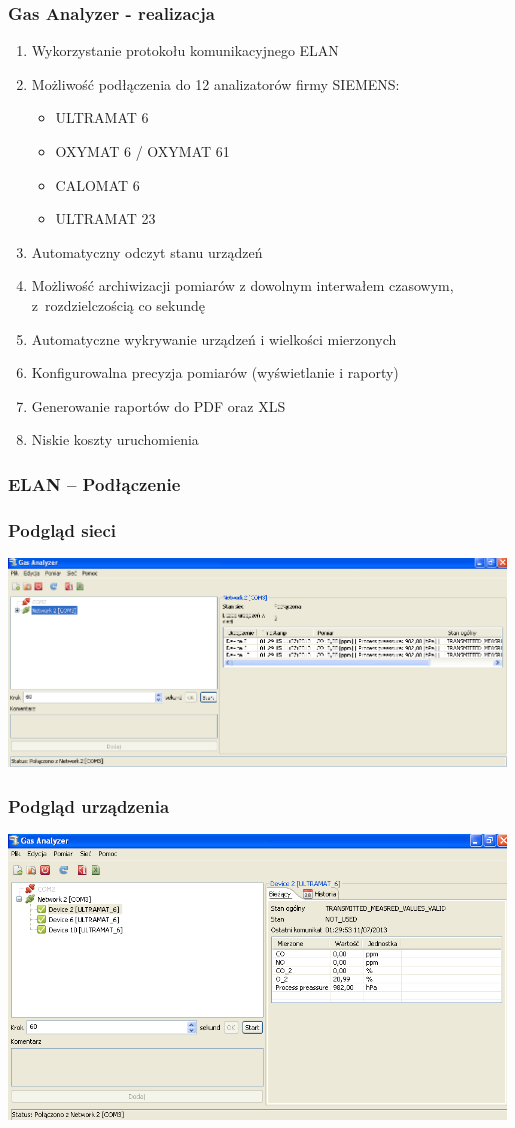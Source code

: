 \documentclass[ucs]{beamer}
\begin{document}
\begin{frame}
\frametitle{Gas Analyzer - realizacja}
\begin{enumerate}
\item Wykorzystanie protokołu komunikacyjnego ELAN
\item Możliwość podłączenia do 12 analizatorów firmy SIEMENS:
\begin{itemize}
\item ULTRAMAT 6
\item OXYMAT 6 / OXYMAT 61
\item CALOMAT 6
\item ULTRAMAT 23
\end{itemize}
\item Automatyczny odczyt stanu urządzeń
\item Możliwość archiwizacji pomiarów z dowolnym interwałem czasowym, z~rozdzielczością co sekundę
\item Automatyczne wykrywanie urządzeń i wielkości mierzonych
\item Konfigurowalna precyzja pomiarów (wyświetlanie i raporty)
\item Generowanie raportów do PDF oraz XLS
\item Niskie koszty uruchomienia
\end{enumerate}
\end{frame}

\begin{frame}
\frametitle{ELAN -- Podłączenie}

\end{frame}

\begin{frame}
\frametitle{Podgląd sieci}
\includegraphics[width=0.99\textwidth]{images/detailNetworkW}
\end{frame}

\begin{frame}
\frametitle{Podgląd urządzenia}
\includegraphics[width=0.99\textwidth]{images/detailDeviceW}
\end{frame}
\end{document}
